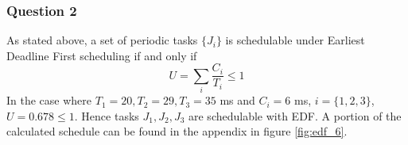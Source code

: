 \subsubsection{Question 2}

As stated above, a set of periodic tasks $\{J_i\}$ is schedulable under Earliest
Deadline First scheduling if and only if
$$U = \sum_{i} \dfrac{C_i}{T_i} \leq 1$$
In the case where $T_1 = 20, T_2 = 29, T_3 = 35$ ms and $C_i = 6$ ms,
$i=\{1,2,3\}$, $U=0.678 \leq 1$. Hence tasks $J_1, J_2, J_3$ are schedulable
with EDF. A portion of the calculated schedule can be found in
the appendix in figure \ref{fig:edf_6}.
